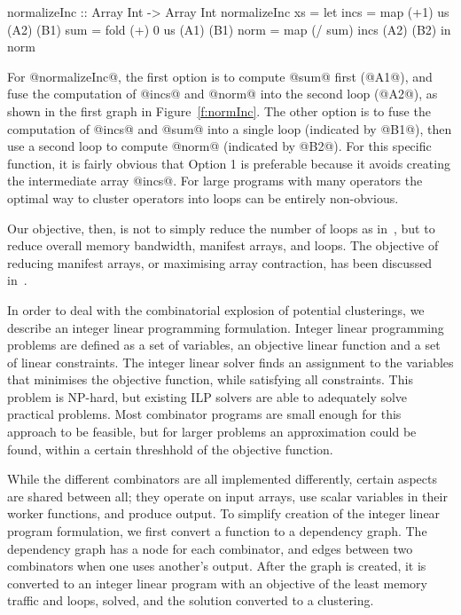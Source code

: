 \begin{code}
 normalizeInc :: Array Int -> Array Int
 normalizeInc xs
  = let incs = map  (+1)    us      (A2) (B1)
        sum  = fold (+) 0   us      (A1) (B1)
        norm = map  (/ sum) incs    (A2) (B2)
    in  norm
\end{code}
For @normalizeInc@, the first option is to compute @sum@ first (@A1@), and fuse the computation of @incs@ and @norm@ into the second loop (@A2@), as shown in the first graph in Figure~\ref{f:normInc}. The other option is to fuse the computation of @incs@ and @sum@ into a single loop (indicated by @B1@), then use a second loop to compute @norm@ (indicated by @B2@). For this specific function, it is fairly obvious that Option 1 is preferable because it avoids creating the intermediate array @incs@. For large programs with many operators the optimal way to cluster operators into loops can be entirely non-obvious. 

Our objective, then, is not to simply reduce the number of loops as in~\cite{kennedy1993typedfusion}, but to reduce overall memory bandwidth, manifest arrays, and loops.
The objective of reducing manifest arrays, or maximising array contraction, has been discussed in~\cite{gao1993collective, darte2002contraction}.

In order to deal with the combinatorial explosion of potential clusterings, we describe an integer linear programming formulation.
Integer linear programming problems are defined as a set of variables, an objective linear function and a set of linear constraints.
The integer linear solver finds an assignment to the variables that minimises the objective function, while satisfying all constraints.
This problem is NP-hard, but existing ILP solvers are able to adequately solve practical problems.
Most combinator programs are small enough for this approach to be feasible, but for larger problems an approximation could be found, within a certain threshhold of the objective function.



While the different combinators are all implemented differently, certain aspects are shared between all; they operate on input arrays, use scalar variables in their worker functions, and produce output.
To simplify creation of the integer linear program formulation, we first convert a function to a dependency graph.
The dependency graph has a node for each combinator, and edges between two combinators when one uses another's output.
After the graph is created, it is converted to an integer linear program with an objective of the least memory traffic and loops, solved, and the solution converted to a clustering.

